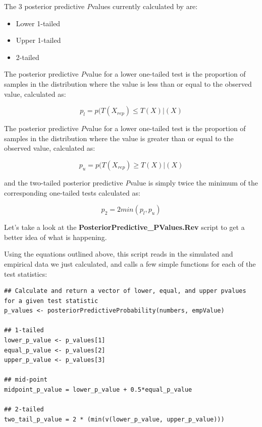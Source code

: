 The 3 posterior predictive \textit{P}\-values currently
calculated by \RevBayes are: 

\begin{itemize}
\item Lower 1-tailed 
\item Upper 1-tailed
\item 2-tailed
\end{itemize}

The posterior predictive \textit{P}\-value for a lower one-tailed test is the proportion of samples in the distribution
where the value is less than or equal to the observed value, calculated as:

\begin{equation*} 
    p_l=p(T(X_{rep})\leqslant T(X)|(X)
\end{equation*}

The posterior predictive \textit{P}\-value for a lower one-tailed test is the proportion of samples in the distribution
where the value is greater than or equal to the observed value, calculated as:

\begin{equation*} 
    p_u=p(T(X_{rep})\geqslant T(X)|(X)
\end{equation*}

and the two-tailed posterior predictive \textit{P}\-value is simply twice the minimum of the corresponding one-tailed tests
calculated as:

\begin{equation*} 
p_2=2min(p_l,p_u)
\end{equation*}

Let's take a look at the \textbf{PosteriorPredictive\_PValues.Rev} script to get a better idea of what is 
happening.

Using the equations outlined above, this script reads in the simulated and empirical data we just calculated, and calls a few simple functions
for each of the test statistics:

{\tt \begin{Snugshade}[184,207,236]
\begin{lstlisting}
## Calculate and return a vector of lower, equal, and upper pvalues for a given test statistic
p_values <- posteriorPredictiveProbability(numbers, empValue)

## 1-tailed
lower_p_value <- p_values[1] 
equal_p_value <- p_values[2] 
upper_p_value <- p_values[3] 

## mid-point
midpoint_p_value = lower_p_value + 0.5*equal_p_value

## 2-tailed
two_tail_p_value = 2 * (min(v(lower_p_value, upper_p_value)))
\end{lstlisting}
\end{Snugshade}}

